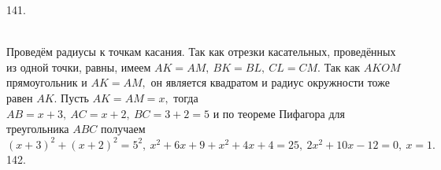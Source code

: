 \documentclass[12pt]{article}
\begin{document}
141. \begin{figure}[ht!]
\end{figure}\\
Проведём радиусы к точкам касания. Так как отрезки касательных, проведённых из одной точки, равны, имеем $AK=AM,\ BK=BL,\ CL=CM.$ Так как $AKOM$ прямоугольник и $AK=AM,$ он является квадратом и радиус окружности тоже равен $AK.$ Пусть $AK=AM=x,$ тогда $AB=x+3,\ AC=x+2,\ BC=3+2=5$ и по теореме Пифагора для треугольника $ABC$ получаем $(x+3)^2+(x+2)^2=5^2,\ x^2+6x+9+x^2+4x+4=25,\ 2x^2+10x-12=0,\ x=1.$\\
142. \begin{figure}[ht!]
\end{figure}\\
\end{document}
